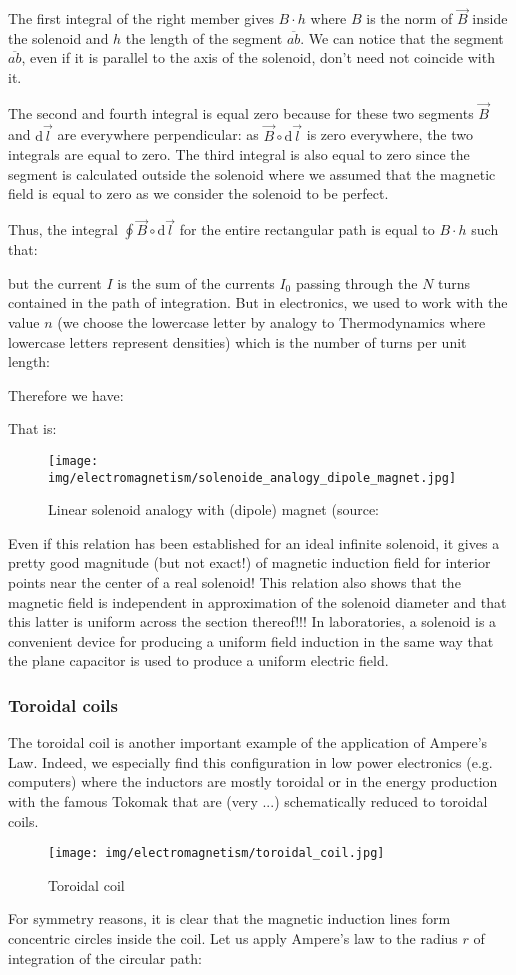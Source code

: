 	The first integral of the right member gives $B\cdot h$ where $B$ is the norm of $\vec{B}$ inside the solenoid and $h$ the length of the segment $\overline{ab}$. We can notice that the segment $\overline{ab}$, even if it is parallel to the axis of the solenoid, don't need not coincide with it.
	
	The second and fourth integral is equal zero because for these two segments $\vec{B}$ and $\mathrm{d}\vec{l}$ are everywhere perpendicular: as $\vec{B}\circ\mathrm{d}\vec{l}$ is zero everywhere, the two integrals are equal to zero. The third integral is also equal to zero since the segment is calculated outside the solenoid where we assumed that the magnetic field is equal to zero as we consider the solenoid to be perfect.	
	
	Thus, the integral $\oint\vec{B}\circ\mathrm{d}\vec{l}$ for the entire rectangular path is equal to $B\cdot h$ such that:
	
	but the current $I$ is the sum of the currents $I_0$ passing through the $N$ turns contained in the path of integration. But in electronics, we used to work with the value $n$ (we choose the lowercase letter by analogy to Thermodynamics where lowercase letters represent densities) which is the number of turns per unit length:
	
	Therefore we have:
	
	That is:
	
	\begin{figure}[H]
		\centering
		\texttt{[image: img/electromagnetism/solenoide\_analogy\_dipole\_magnet.jpg]}
		\caption[Linear solenoid analogy with (dipole) magnet]{Linear solenoid analogy with (dipole) magnet (source: }
	\end{figure}
	Even if this relation has been established for an ideal infinite solenoid, it gives a pretty good magnitude (but not exact!) of magnetic induction field for interior points near the center of a real solenoid! This relation also shows that the magnetic field is independent in approximation of the solenoid diameter and that this latter is uniform across the section thereof!!! In laboratories, a solenoid is a convenient device for producing a uniform field induction in the same way that the plane capacitor is used to produce a uniform electric field.
	
	\pagebreak
	\subsubsection{Toroidal coils}
	The toroidal coil is another important example of the application of Ampere's Law. Indeed, we especially find this configuration in low power electronics (e.g. computers) where the inductors are mostly toroidal or in the energy production with the famous Tokomak that are (very ...) schematically reduced to toroidal coils.
	\begin{figure}[H]
		\centering
		\texttt{[image: img/electromagnetism/toroidal\_coil.jpg]}
		\caption{Toroidal coil}
	\end{figure}
	For symmetry reasons, it is clear that the magnetic induction lines form concentric circles inside the coil. Let us apply Ampere's law to the radius $r$ of integration of the circular path:
	
